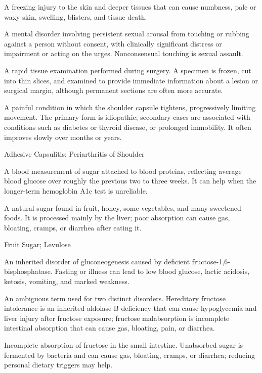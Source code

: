  A freezing injury to the skin and deeper tissues that can cause numbness, pale or waxy skin, swelling, blisters, and tissue death.

 A mental disorder involving persistent sexual arousal from touching or rubbing against a person without consent, with clinically significant distress or impairment or acting on the urges. Nonconsensual touching is sexual assault.

 A rapid tissue examination performed during surgery. A specimen is frozen, cut into thin slices, and examined to provide immediate information about a lesion or surgical margin, although permanent sections are often more accurate.

 A painful condition in which the shoulder capsule tightens, progressively limiting movement. The primary form is idiopathic; secondary cases are associated with conditions such as diabetes or thyroid disease, or prolonged immobility. It often improves slowly over months or years.

\synonyms
Adhesive Capsulitis; Periarthritis of Shoulder

 A blood measurement of sugar attached to blood proteins, reflecting average blood glucose over roughly the previous two to three weeks. It can help when the longer-term hemoglobin A1c test is unreliable.

 A natural sugar found in fruit, honey, some vegetables, and many sweetened foods. It is processed mainly by the liver; poor absorption can cause gas, bloating, cramps, or diarrhea after eating it.

\synonyms
Fruit Sugar; Levulose

 An inherited disorder of gluconeogenesis caused by deficient fructose-1,6-bisphosphatase. Fasting or illness can lead to low blood glucose, lactic acidosis, ketosis, vomiting, and marked weakness.

 An ambiguous term used for two distinct disorders. Hereditary fructose intolerance is an inherited aldolase B deficiency that can cause hypoglycemia and liver injury after fructose exposure; fructose malabsorption is incomplete intestinal absorption that can cause gas, bloating, pain, or diarrhea.

 Incomplete absorption of fructose in the small intestine. Unabsorbed sugar is fermented by bacteria and can cause gas, bloating, cramps, or diarrhea; reducing personal dietary triggers may help.

